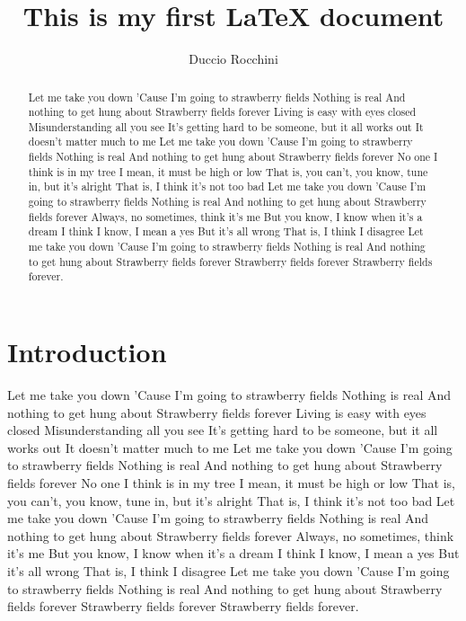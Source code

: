\documentclass[12pt]{article}
\title{This is my first LaTeX document}
\author{Duccio Rocchini}
\begin{document}
\maketitle

\begin{abstract}
Let me take you down
'Cause I'm going to strawberry fields
Nothing is real
And nothing to get hung about
Strawberry fields forever
Living is easy with eyes closed
Misunderstanding all you see
It's getting hard to be someone, but it all works out
It doesn't matter much to me
Let me take you down
'Cause I'm going to strawberry fields
Nothing is real
And nothing to get hung about
Strawberry fields forever
No one I think is in my tree
I mean, it must be high or low
That is, you can't, you know, tune in, but it's alright
That is, I think it's not too bad
Let me take you down
'Cause I'm going to strawberry fields
Nothing is real
And nothing to get hung about
Strawberry fields forever
Always, no sometimes, think it's me
But you know, I know when it's a dream
I think I know, I mean a yes
But it's all wrong
That is, I think I disagree
Let me take you down
'Cause I'm going to strawberry fields
Nothing is real
And nothing to get hung about
Strawberry fields forever
Strawberry fields forever
Strawberry fields forever.
\end{abstract}

\section{Introduction}
Let me take you down
'Cause I'm going to strawberry fields
Nothing is real
And nothing to get hung about
Strawberry fields forever
Living is easy with eyes closed
Misunderstanding all you see
It's getting hard to be someone, but it all works out
It doesn't matter much to me
Let me take you down
'Cause I'm going to strawberry fields
Nothing is real
And nothing to get hung about
Strawberry fields forever
No one I think is in my tree
I mean, it must be high or low
That is, you can't, you know, tune in, but it's alright
That is, I think it's not too bad
Let me take you down
'Cause I'm going to strawberry fields
Nothing is real
And nothing to get hung about
Strawberry fields forever
Always, no sometimes, think it's me
But you know, I know when it's a dream
I think I know, I mean a yes
But it's all wrong
That is, I think I disagree
Let me take you down
'Cause I'm going to strawberry fields
Nothing is real
And nothing to get hung about
Strawberry fields forever
Strawberry fields forever
Strawberry fields forever.
\end{document}
